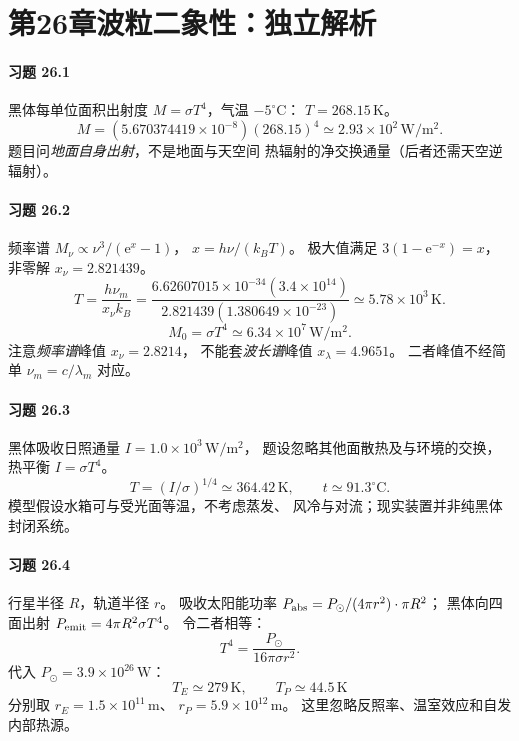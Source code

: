 \section*{第26章\quad 波粒二象性：独立解析}
\paragraph{习题 26.1}
黑体每单位面积出射度
\(M=\sigma T^4\)，气温 \(-5^\circ\mathrm C\)：
\(T=268.15\,\mathrm K\)。
\[
\boxed{M=(5.670374419\times10^{-8})(268.15)^4
\simeq2.93\times10^2\,\mathrm{W/m^2}}.
\]
题目问\emph{地面自身出射}，不是地面与天空间
热辐射的净交换通量（后者还需天空逆辐射）。

\paragraph{习题 26.2}
频率谱 \(M_\nu\propto\nu^3/(\mathrm e^x-1)\)，
\(x=h\nu/(k_BT)\)。
极大值满足 \(3(1-\mathrm e^{-x})=x\)，
非零解 \(x_\nu=2.821439\)。
\[
\boxed{T=\frac{h\nu_m}{x_\nu k_B}
=\frac{6.62607015\times10^{-34}(3.4\times10^{14})}
{2.821439(1.380649\times10^{-23})}
\simeq5.78\times10^3\,\mathrm K}.
\]
\[
\boxed{M_0=\sigma T^4\simeq6.34\times10^7\,\mathrm{W/m^2}}.
\]
注意\emph{频率谱}峰值 \(x_\nu=2.8214\)，
不能套\emph{波长谱}峰值 \(x_\lambda=4.9651\)。
二者峰值不经简单 \(\nu_m=c/\lambda_m\) 对应。

\paragraph{习题 26.3}
黑体吸收日照通量 \(I=1.0\times10^3\,\mathrm{W/m^2}\)，
题设忽略其他面散热及与环境的交换，
热平衡 \(I=\sigma T^4\)。
\[
\boxed{T=(I/\sigma)^{1/4}\simeq364.42\,\mathrm K},
\qquad
\boxed{t\simeq91.3^\circ\mathrm C}.
\]
模型假设水箱可与受光面等温，不考虑蒸发、
风冷与对流；现实装置并非纯黑体封闭系统。

\paragraph{习题 26.4}
行星半径 \(R\)，轨道半径 \(r\)。
吸收太阳能功率
\(P_{\rm abs}=P_\odot/(4\pi r^2)\cdot\pi R^2\)；
黑体向四面出射
\(P_{\rm emit}=4\pi R^2\sigma T^4\)。
令二者相等：
\[
\boxed{T^4=\frac{P_\odot}{16\pi\sigma r^2}}.
\]
代入 \(P_\odot=3.9\times10^{26}\,\mathrm W\)：
\[
\boxed{T_E\simeq279\,\mathrm K},\qquad
\boxed{T_P\simeq44.5\,\mathrm K}
\]
分别取 \(r_E=1.5\times10^{11}\,\mathrm m\)、
\(r_P=5.9\times10^{12}\,\mathrm m\)。
这里忽略反照率、温室效应和自发内部热源。

